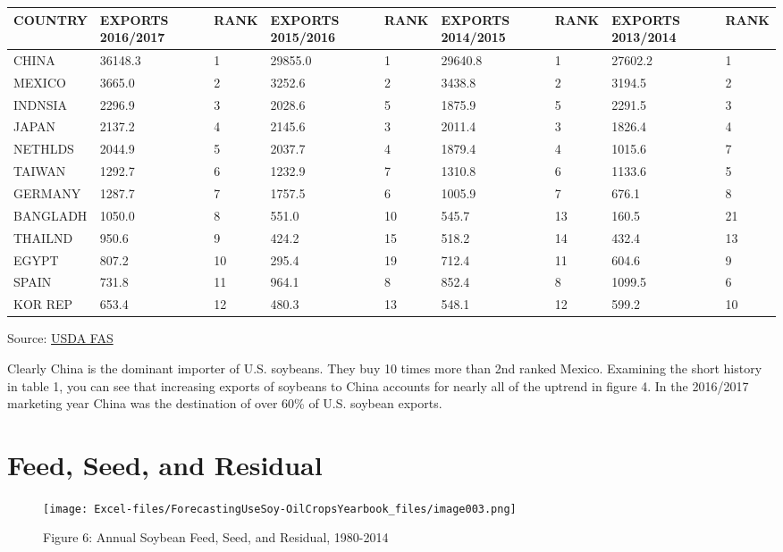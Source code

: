 \documentclass[
]{book}
\begin{document}
\begin{tabular}{l|l|l|l|l|l|l|l|l}
\hline
COUNTRY & EXPORTS 2016/2017 & RANK & EXPORTS 2015/2016 & RANK & EXPORTS 2014/2015 & RANK & EXPORTS 2013/2014 & RANK\\
\hline
CHINA & 36148.3 & 1 & 29855.0 & 1 & 29640.8 & 1 & 27602.2 & 1\\
\hline
MEXICO & 3665.0 & 2 & 3252.6 & 2 & 3438.8 & 2 & 3194.5 & 2\\
\hline
INDNSIA & 2296.9 & 3 & 2028.6 & 5 & 1875.9 & 5 & 2291.5 & 3\\
\hline
JAPAN & 2137.2 & 4 & 2145.6 & 3 & 2011.4 & 3 & 1826.4 & 4\\
\hline
NETHLDS & 2044.9 & 5 & 2037.7 & 4 & 1879.4 & 4 & 1015.6 & 7\\
\hline
TAIWAN & 1292.7 & 6 & 1232.9 & 7 & 1310.8 & 6 & 1133.6 & 5\\
\hline
GERMANY & 1287.7 & 7 & 1757.5 & 6 & 1005.9 & 7 & 676.1 & 8\\
\hline
BANGLADH & 1050.0 & 8 & 551.0 & 10 & 545.7 & 13 & 160.5 & 21\\
\hline
THAILND & 950.6 & 9 & 424.2 & 15 & 518.2 & 14 & 432.4 & 13\\
\hline
EGYPT & 807.2 & 10 & 295.4 & 19 & 712.4 & 11 & 604.6 & 9\\
\hline
SPAIN & 731.8 & 11 & 964.1 & 8 & 852.4 & 8 & 1099.5 & 6\\
\hline
KOR REP & 653.4 & 12 & 480.3 & 13 & 548.1 & 12 & 599.2 & 10\\
\hline
\end{tabular}

Source: \href{http://apps.fas.usda.gov/export-sales/myrk_rpt.htm}{USDA FAS}

Clearly China is the dominant importer of U.S. soybeans. They buy 10 times more than 2nd ranked Mexico. Examining the short history in table 1, you can see that increasing exports of soybeans to China accounts for nearly all of the uptrend in figure 4. In the 2016/2017 marketing year China was the destination of over 60\% of U.S. soybean exports.

\hypertarget{feed-seed-and-residual}{%
\section{Feed, Seed, and Residual}\label{feed-seed-and-residual}}

\begin{figure}
\centering
\texttt{[image: Excel-files/ForecastingUseSoy-OilCropsYearbook\_files/image003.png]}
\caption{Figure 6: Annual Soybean Feed, Seed, and Residual, 1980-2014}
\end{figure}
\end{document}
